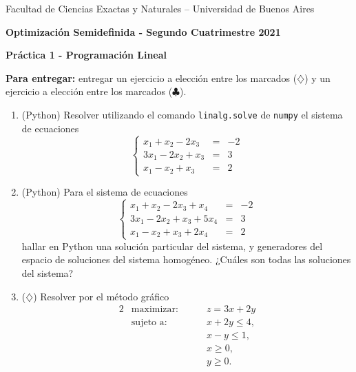 \documentclass[11pt]{article}
\begin{document}
\begin{center}

{\small Facultad de Ciencias Exactas
y Naturales -- Universidad de Buenos Aires } \vskip 1cm

\textbf{{\large Optimización Semidefinida} - Segundo Cuatrimestre 2021}

\medskip\textbf{Pr\'actica 1 - Programación Lineal}
\end{center}

\medskip

\textbf{Para entregar:} entregar un ejercicio a elección entre los marcados ($\diamondsuit$) y un ejercicio a elección entre los marcados ($\clubsuit$).

\begin{enumerate}

\item (Python) Resolver utilizando el comando \texttt{linalg.solve} de \texttt{numpy} el sistema de ecuaciones
$$\left\{
\begin{array}{ccc}
x_1+x_2-2x_3 &=& -2 \\
3x_1-2x_2+x_3 &=& 3 \\
x_1-x_2+x_3 &=& 2 \end{array}\right.
$$

\item (Python) Para el sistema de ecuaciones
$$
\left\{
\begin{array}{ccc}
x_1+x_2-2x_3+x_4 &=& -2 \\ 3x_1-2x_2+x_3+5x_4 &=& 3 \\
x_1-x_2+x_3+2x_4 &=& 2 \end{array}\right.
$$
hallar en Python una solución particular del sistema, y generadores del espacio de soluciones del sistema homogéneo. ¿Cuáles son todas las soluciones del sistema?

\item \label{ej:metodografico} ($\diamondsuit$) Resolver por el método gráfico
\begin{alignat*}{2}
  & \text{maximizar: } & & z = 3x + 2y \\
   & \text{sujeto a: } & \quad & x + 2y \le 4, \\
   & & & x-y \le 1, \\
   & & & x \ge 0, \\
   & & & y \ge 0.
\end{alignat*}


\end{enumerate}
\end{document}
